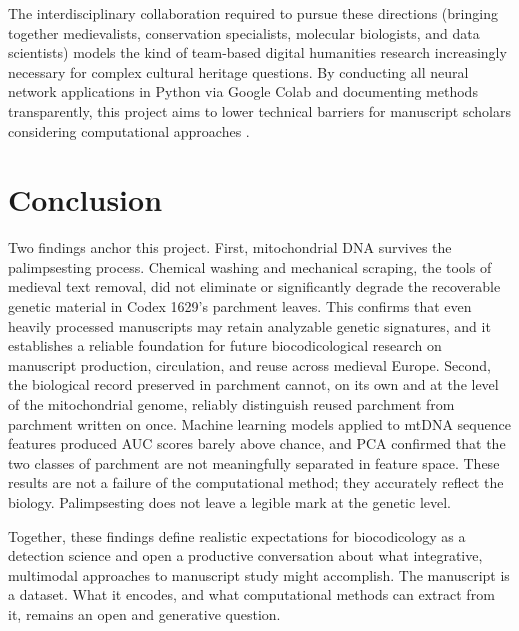 \documentclass[final]{anthology-ch} %
\begin{document}
The interdisciplinary collaboration required to pursue these directions (bringing together medievalists, conservation specialists, molecular biologists, and data scientists) models the kind of team-based digital humanities research increasingly necessary for complex cultural heritage questions. By conducting all neural network applications in Python via Google Colab and documenting methods transparently, this project aims to lower technical barriers for manuscript scholars considering computational approaches \cite{schoch2013big, stokes2009computer, camps2016chanson}.

\section{Conclusion} \label{sec:conclusion}

Two findings anchor this project. First, mitochondrial DNA survives the palimpsesting process. Chemical washing and mechanical scraping, the tools of medieval text removal, did not eliminate or significantly degrade the recoverable genetic material in Codex 1629's parchment leaves. This confirms that even heavily processed manuscripts may retain analyzable genetic signatures, and it establishes a reliable foundation for future biocodicological research on manuscript production, circulation, and reuse across medieval Europe. Second, the biological record preserved in parchment cannot, on its own and at the level of the mitochondrial genome, reliably distinguish reused parchment from parchment written on once. Machine learning models applied to mtDNA sequence features produced AUC scores barely above chance, and PCA confirmed that the two classes of parchment are not meaningfully separated in feature space. These results are not a failure of the computational method; they accurately reflect the biology. Palimpsesting does not leave a legible mark at the genetic level.

Together, these findings define realistic expectations for biocodicology as a detection science and open a productive conversation about what integrative, multimodal approaches to manuscript study might accomplish. The manuscript is a dataset. What it encodes, and what computational methods can extract from it, remains an open and generative question.

\printbibliography
\end{document}
